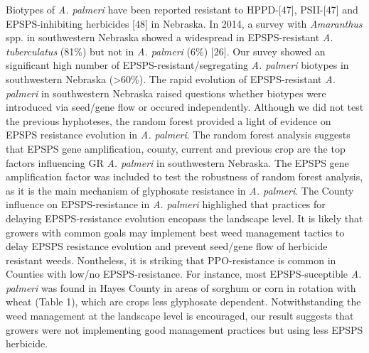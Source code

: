 \documentclass[10pt,letterpaper]{article}
\begin{document}
Biotypes of \emph{A. palmeri} have been reported resistant to
HPPD-{[}47{]}, PSII-{[}47{]} and EPSPS-inhibiting herbicides {[}48{]} in
Nebraska. In 2014, a survey with \emph{Amaranthus} spp. in southwestern
Nebraska showed a widespread in EPSPS-resistant \emph{A. tuberculatus}
(81\%) but not in \emph{A. palmeri} (6\%) {[}26{]}. Our suvey showed an
significant high number of EPSPS-resistant/segregating \emph{A. palmeri}
biotypes in southwestern Nebraska (\textgreater{}60\%). The rapid
evolution of EPSPS-resistant \emph{A. palmeri} in southwestern Nebraska
raised questions whether biotypes were introduced via seed/gene flow or
occured independently. Although we did not test the previous hyphoteses,
the random forest provided a light of evidence on EPSPS resistance
evolution in \emph{A. palmeri}. The random forest analysis suggests that
EPSPS gene amplification, county, current and previous crop are the top
factors influencing GR \emph{A. palmeri} in southwestern Nebraska. The
EPSPS gene amplification factor was included to test the robustness of
random forest analysis, as it is the main mechanism of glyphosate
resistance in \emph{A. palmeri}. The County influence on
EPSPS-resistance in \emph{A. palmeri} highlighed that practices for
delaying EPSPS-resistance evolution encopass the landscape level. It is
likely that growers with common goals may implement best weed management
tactics to delay EPSPS resistance evolution and prevent seed/gene flow
of herbicide resistant weeds. Nontheless, it is striking that
PPO-resistance is common in Counties with low/no EPSPS-resistance. For
instance, most EPSPS-suceptible \emph{A. palmeri} was found in Hayes
County in areas of sorghum or corn in rotation with wheat (Table 1),
which are crops less glyphosate dependent. Notwithstanding the weed
management at the landscape level is encouraged, our result suggests
that growers were not implementing good management practices but using
less EPSPS herbicide.
\end{document}
